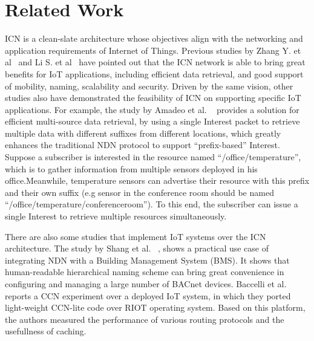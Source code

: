 \section{Related Work}
\label{sec:related}

ICN is a clean-slate architecture whose objectives align with the networking and application requirements of Internet of Things. Previous studies by Zhang Y. et al~\cite{zhang2013icn} and Li S. et al~\cite{li2014comparative} have pointed out that the ICN network is able to bring great benefits for IoT applications, 
including efficient data retrieval,  and good support of mobility, naming, scalability and security. Driven by the same vision, other studies also have demonstrated the feasibility of ICN on supporting specific IoT applications. For example, the study by Amadeo et al. ~\cite{amadeo2014multi} provides a solution for efficient multi-source data retrieval, by 
using a single Interest packet to retrieve multiple data with different suffixes from different locations, which greatly enhances 
the traditional NDN protocol to support  ``prefix-based''  Interest. 
Suppose a subscriber is interested in the resource named ``/office/temperature'', which is  to gather  information from multiple sensors deployed in his office.Meanwhile, temperature sensors can advertise their resource with this prefix and their own suffix (e.g sensor in the conference room should be named ``/office/temperature/conferenceroom''). To this end, the subscriber can issue a single Interest to retrieve multiple resources simultaneously.

\iffalse
George et al.~\cite{polyzos2015building} proposes a Publish-Subscribe Internetworking ICN architecture
where identifiers can be used to represent a thing, an application, a group of similar things, or any contextual specific entity in the network. A Rendezvous Node functions as a middle box where advertisements from publishers and subscription requests from subscribers can meet to form a membership.
\fi

There are also some studies that implement IoT systems over the ICN architecture. The study by Shang et al. ~\cite{shang2014securing}, shows a practical use case of  integrating NDN with a Building Management System (BMS). It shows that human-readable hierarchical naming scheme can bring great convenience in configuring and managing a large number of BACnet devices. Baccelli et al.~\cite{baccelli2014information} reports a CCN experiment  over a deployed IoT system, in which they ported light-weight CCN-lite code over RIOT operating system. Based on this platform, the authors measured the performance of various routing protocols and the usefullness of caching.

